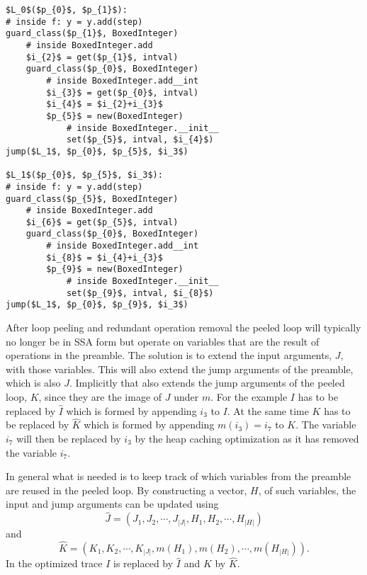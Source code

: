 \documentclass[preprint]{sigplanconf}
\begin{document}
\begin{lstlisting}[mathescape,numbers = right,basicstyle=\setstretch{1.05}\ttfamily\scriptsize]
$L_0$($p_{0}$, $p_{1}$):
# inside f: y = y.add(step)
guard_class($p_{1}$, BoxedInteger)
    # inside BoxedInteger.add
    $i_{2}$ = get($p_{1}$, intval)
    guard_class($p_{0}$, BoxedInteger)
        # inside BoxedInteger.add__int
        $i_{3}$ = get($p_{0}$, intval)
        $i_{4}$ = $i_{2}+i_{3}$
        $p_{5}$ = new(BoxedInteger)
            # inside BoxedInteger.__init__
            set($p_{5}$, intval, $i_{4}$)
jump($L_1$, $p_{0}$, $p_{5}$, $i_3$)

$L_1$($p_{0}$, $p_{5}$, $i_3$):
# inside f: y = y.add(step)
guard_class($p_{5}$, BoxedInteger)
    # inside BoxedInteger.add
    $i_{6}$ = get($p_{5}$, intval)
    guard_class($p_{0}$, BoxedInteger)
        # inside BoxedInteger.add__int
        $i_{8}$ = $i_{4}+i_{3}$
        $p_{9}$ = new(BoxedInteger)
            # inside BoxedInteger.__init__
            set($p_{9}$, intval, $i_{8}$)
jump($L_1$, $p_{0}$, $p_{9}$, $i_3$)
\end{lstlisting}

After loop peeling and redundant operation removal the peeled loop
will typically no longer be in SSA form but operate on variables that are the result
of operations in the preamble. The solution is to extend the input
arguments, $J$, with those variables. This will also extend the
jump arguments of the preamble, which is also $J$. 
Implicitly that also extends the jump arguments of the peeled loop, $K$,
since they are the image of $J$ under $m$. For the example $I$ has to
be replaced by $\hat I$ which is formed by appending $i_3$ to $I$.
At the same time $K$ has to be replaced by
$\hat K$ which is formed by appending $m\left(i_3\right)=i_7$ to $K$.
The variable $i_7$ will then be replaced by $i_3$ by the heap caching
optimization as it has removed the variable $i_7$.

In general what is needed is to keep track of
which variables from the preamble are reused in the peeled loop.
By constructing a vector, $H$,  of such variables, the input and jump
arguments can be updated using
\begin{equation}
  \hat J = \left(J_1, J_2, \cdots, J_{|J|}, H_1, H_2, \cdots, H_{|H|}\right)
  \label{eq:heap-inputargs}
\end{equation}
and
\begin{equation}
  \hat K = \left(K_1, K_2, \cdots, K_{|J|}, m(H_1), m(H_2), \cdots, m(H_{|H|})\right)
  .
  \label{eq:heap-jumpargs}
\end{equation}
In the optimized trace $I$ is replaced by $\hat I$ and $K$ by $\hat
K$.
\end{document}

